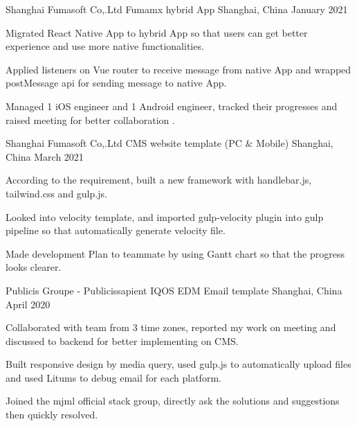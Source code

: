 

\begin{cventries}

  \cventry
    {Shanghai Fumasoft Co,.Ltd} %
    {Fumamx hybrid App} %
    {Shanghai, China} %
    {January 2021} %
    {
      \begin{cvitems} %
        \item {Migrated React Native App to hybrid App so that users can get better experience and use more native functionalities.}
        \item {Applied listeners on Vue router to receive message from native App and wrapped postMessage api for sending message to native App.}
        \item {Managed 1 iOS engineer and 1 Android engineer, tracked their progresses and raised meeting for better collaboration .}
      \end{cvitems}
    }


    \cventry
    {Shanghai Fumasoft Co,.Ltd} %
    {CMS website template (PC \& Mobile)} %
    {Shanghai, China} %
    {March 2021} %
    {
      \begin{cvitems} %
        \item {According to the requirement, built a new framework with handlebar.js, tailwind.css and gulp.js. }
        \item {Looked into velocity template, and imported gulp-velocity plugin into gulp pipeline so that automatically generate velocity file.}
        \item {Made development Plan to teammate by using Gantt chart so that the progress looks clearer.}
      \end{cvitems}
    }

    \cventry
    {Publicis Groupe - Publicissapient} %
    {IQOS EDM Email template} %
    {Shanghai, China} %
    {April 2020} %
    {
      \begin{cvitems} %
        \item {Collaborated with team from 3 time zones, reported my work on meeting and discussed to backend for better implementing on CMS.}
        \item {Built responsive design by media query, used gulp.js to automatically upload files and used Litums to debug email for each platform.}
        \item {Joined the mjml official stack group, directly ask the solutions and suggestions then quickly resolved.}
      \end{cvitems}
    }
    

\end{cventries}
